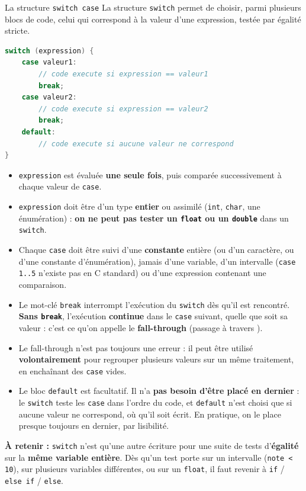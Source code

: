 \begin{UPSTIinfor}{La structure \texttt{switch case}}
    \label{info:switch}
    La structure \texttt{switch} permet de choisir, parmi plusieurs blocs de code, celui qui correspond à la valeur d'une expression, testée par égalité stricte.

    \begin{lstlisting}[language=c]
switch (expression) {
    case valeur1:
        // code execute si expression == valeur1
        break;
    case valeur2:
        // code execute si expression == valeur2
        break;
    default:
        // code execute si aucune valeur ne correspond
}
    \end{lstlisting}

    \begin{itemize}
        \item \texttt{expression} est évaluée \textbf{une seule fois}, puis comparée successivement à chaque valeur de \texttt{case}.
        \item \texttt{expression} doit être d'un type \textbf{entier} ou assimilé (\texttt{int}, \texttt{char}, une énumération) : \textbf{on ne peut pas tester un \texttt{float} ou un \texttt{double}} dans un \texttt{switch}.
        \item Chaque \texttt{case} doit être suivi d'une \textbf{constante} entière (ou d'un caractère, ou d'une constante d'énumération), jamais d'une variable, d'un intervalle (\texttt{case 1..5} n'existe pas en C standard) ou d'une expression contenant une comparaison.
        \item Le mot-clé \texttt{break} interrompt l'exécution du \texttt{switch} dès qu'il est rencontré. \textbf{Sans \texttt{break}}, l'exécution \textbf{continue} dans le \texttt{case} suivant, quelle que soit sa valeur : c'est ce qu'on appelle le \textbf{fall-through} (\og passage à travers \fg).
        \item Le fall-through n'est pas toujours une erreur : il peut être utilisé \textbf{volontairement} pour regrouper plusieurs valeurs sur un même traitement, en enchaînant des \texttt{case} vides.
        \item Le bloc \texttt{default} est facultatif. Il n'a \textbf{pas besoin d'être placé en dernier} : le \texttt{switch} teste les \texttt{case} dans l'ordre du code, et \texttt{default} n'est choisi que si aucune valeur ne correspond, où qu'il soit écrit. En pratique, on le place presque toujours en dernier, par lisibilité.
    \end{itemize}

    \textbf{À retenir :} \texttt{switch} n'est qu'une autre écriture pour une suite de tests d'\textbf{égalité} sur la \textbf{même variable entière}. Dès qu'un test porte sur un intervalle (\texttt{note < 10}), sur plusieurs variables différentes, ou sur un \texttt{float}, il faut revenir à \texttt{if} / \texttt{else if} / \texttt{else}.
\end{UPSTIinfor}
